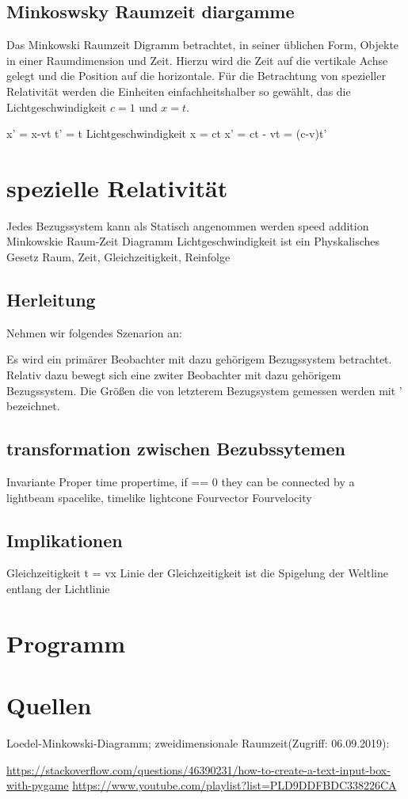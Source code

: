 \documentclass[12pt]{article}
\begin{document}
\subsection{Minkoswsky Raumzeit diargamme}
Das Minkowski Raumzeit Digramm betrachtet, in seiner üblichen Form, Objekte in einer Raumdimension und Zeit.
Hierzu wird die Zeit auf die vertikale Achse gelegt und die Position auf die horizontale.
Für die Betrachtung von spezieller Relativität werden die Einheiten einfachheitshalber so gewählt, das die Lichtgeschwindigkeit $c = 1$ und $x = t$.








x' = x-vt
t' = t
Lichtgeschwindigkeit
x = ct
x' = ct - vt = (c-v)t'
\section{spezielle Relativität}
Jedes Bezugssystem kann als Statisch angenommen werden
speed addition
Minkowskie Raum-Zeit Diagramm
Lichtgeschwindigkeit ist ein Physkalisches Gesetz
Raum, Zeit, Gleichzeitigkeit, Reinfolge
\subsection{Herleitung}
Nehmen wir folgendes Szenarion an:

Es wird ein primärer Beobachter mit dazu gehörigem Bezugssystem betrachtet.
Relativ dazu bewegt sich eine zwiter Beobachter mit dazu gehörigem Bezugssystem.
Die Größen die von letzterem Bezugsystem gemessen werden mit ' bezeichnet.


\subsection{transformation zwischen Bezubssytemen}
Invariante Proper time
propertime, if == 0 they can be connected by a lightbeam
spacelike, timelike
lightcone
Fourvector
Fourvelocity

\subsection{Implikationen}
Gleichzeitigkeit t = vx
Linie der Gleichzeitigkeit ist die Spigelung der Weltline entlang der Lichtlinie
\section{Programm}



\section{Quellen}
Loedel-Minkowski-Diagramm; zweidimensionale Raumzeit(Zugriff: 06.09.2019):

\url{https://stackoverflow.com/questions/46390231/how-to-create-a-text-input-box-with-pygame}
\url{https://www.youtube.com/playlist?list=PLD9DDFBDC338226CA}
\end{document}
